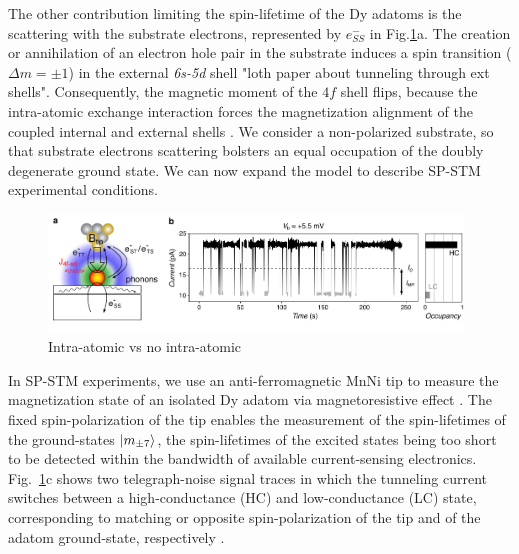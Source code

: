 \documentclass[
reprint,amsmath,amssymb,aps]{revtex4-2}
\begin{document}
The other contribution limiting the spin-lifetime of the Dy adatoms is the scattering with the substrate electrons, represented by $e^{-}_{SS}$ in Fig.\ref{fig:no_tip_tip_telegraph}a. The creation or annihilation of an electron hole pair in the substrate induces a spin transition ($\Delta m=\pm 1$) in the external \textit{6s-5d} shell \cite{}"loth paper about tunneling through ext shells". Consequently, the magnetic moment of the $4f$ shell flips, because the intra-atomic exchange interaction forces the magnetization alignment of the coupled internal and external shells \cite{pivetta2020}. We consider a non-polarized substrate, so that substrate electrons scattering bolsters an equal occupation of the doubly degenerate ground state.\newline
\indent We can now expand the model to describe SP-STM experimental conditions.
\begin{figure}[ht!]
\includegraphics[width=0.98\textwidth]{Fig2_new.pdf}
\caption{Intra-atomic vs no intra-atomic
\label{fig:no_tip_tip_telegraph} }
\end{figure}
In SP-STM experiments, we use an anti-ferromagnetic MnNi tip to measure the magnetization state of an isolated Dy adatom via magnetoresistive effect \cite{}. The fixed spin-polarization of the tip enables the measurement of the spin-lifetimes of the ground-states $\ket{m_{\pm7}}$, the spin-lifetimes of the excited states being too short to be detected within the bandwidth of available current-sensing electronics. Fig.~\ref{fig:no_tip_tip_telegraph}c shows two telegraph-noise signal traces in which the tunneling current switches between a high-conductance (HC) and low-conductance (LC) state, corresponding to matching or opposite spin-polarization of the tip and of the adatom ground-state, respectively \cite{}. 
\end{document}
